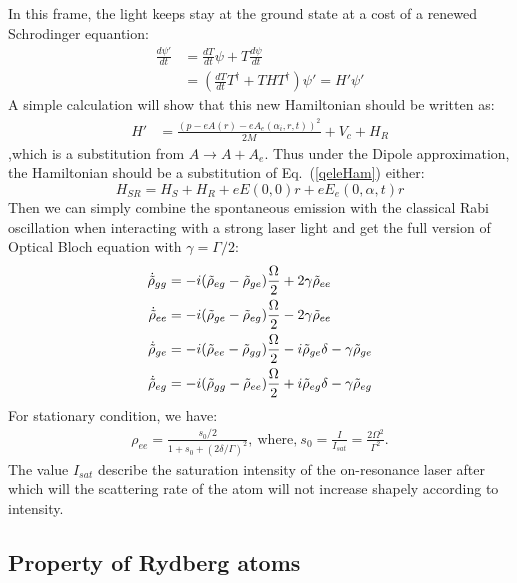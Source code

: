 \documentclass[11pt]{article}
\begin{document}
In this frame, the light keeps stay at the ground state at a cost of a renewed Schrodinger equantion:
\begin{align*}
    \frac{d\psi'}{dt} &= \frac{dT}{dt} \psi + T \frac{d\psi}{dt} \\
    &=(\frac{dT}{dt}T^\dagger + THT^\dagger) \psi' = H' \psi'
\end{align*}
A simple calculation will show that this new Hamiltonian should be written as:
\begin{align*}
    H' &= \frac{(p - e A(r) - e A_e(\alpha_i, r , t))^2}{2M} + V_{c} + H_R
\end{align*}
,which is a substitution from $A \to A + A_e$. Thus under the Dipole approximation, the Hamiltonian should be a substitution of Eq.~(\ref{qeleHam}) either: 
$$
H_{SR}  =H_S+H_R+e E(0,0) r + e E_e(0,\alpha, t) r 
$$
Then we can simply combine the spontaneous emission with the classical Rabi oscillation when interacting with a strong laser light and get the full version of  Optical Bloch equation with $\gamma = \Gamma/2$: 
\begin{align*}
    \Dot{\Tilde{\rho}}_{gg}  &= -i(\Tilde{\rho}_{eg} - \Tilde{\rho}_{ge}) \frac{\Omega}{2} + 2\gamma \Tilde{\rho}_{ee} \\
    \Dot{\Tilde{\rho}}_{ee}  &= -i (\Tilde{\rho}_{ge} - \Tilde{\rho}_{eg}) \frac{\Omega}{2} - 2\gamma \Tilde{\rho}_{ee} \\
    \Dot{\Tilde{\rho}}_{ge}  &= -i (\Tilde{\rho}_{ee} - \Tilde{\rho}_{gg}) \frac{\Omega}{2} -i\Tilde{\rho}_{ge} \delta  -\gamma \Tilde{\rho}_{ge} \\
    \Dot{\Tilde{\rho}}_{eg}  &= -i (\Tilde{\rho}_{gg} - \Tilde{\rho}_{ee}) \frac{\Omega}{2}  +i\Tilde{\rho}_{eg} \delta -\gamma \Tilde{\rho}_{eg}
\end{align*}
For stationary condition, we have:
\begin{align}
    \rho_{ee} = \frac{s_0/2}{1+s_0 + (2\delta/\Gamma)^2}, ~\text{where,}~ s_0 = \frac{I}{I_{sat}} = \frac{2\Omega^2}{ \Gamma^2}.
\end{align}
The value $I_{sat}$ describe the saturation intensity of the on-resonance laser after which will the scattering rate of the atom will not increase shapely according to intensity. 




\subsection{Property of Rydberg atoms}
\end{document}
